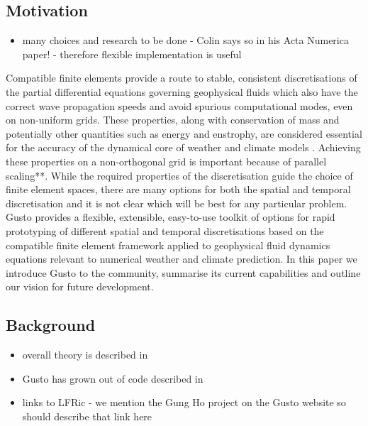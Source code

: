 \documentclass[journal abbreviation, manuscript]{copernicus}
\begin{document}
\introduction   %

\subsection{Motivation}
\begin{itemize}
\item many choices and research to be done - Colin says so in his Acta Numerica paper! - therefore flexible implementation is useful
\end{itemize}

Compatible finite elements provide a route to stable, consistent
discretisations of the partial differential equations governing
geophysical fluids which also have the correct wave propagation speeds
and avoid spurious computational modes, even on non-uniform
grids. These properties, along with conservation of mass and
potentially other quantities such as energy and enstrophy, are
considered essential for the accuracy of the dynamical core of weather
and climate models \citep{staniforth2012horizontal}. Achieving these
properties on a non-orthogonal grid is important because of parallel
scaling**. While the required properties of the discretisation guide the
choice of finite element spaces, there are many options for both the
spatial and temporal discretisation and it is not clear which will be
best for any particular problem. Gusto provides a flexible,
extensible, easy-to-use toolkit of options for rapid prototyping of
different spatial and temporal discretisations based on the compatible
finite element framework applied to geophysical fluid dynamics
equations relevant to numerical weather and climate prediction. In
this paper we introduce Gusto to the community, summarise its current
capabilities and outline our vision for future development.

\subsection{Background}

\begin{itemize}
\item overall theory is described in \citet{gibson2019compatible, cotter2023compatible}
\item Gusto has grown out of code described in \citet{natale2016compatible, cotter2012mixed, bendall2019recovered, bendall2020compatible, yamazaki2017vertical, shipton2018higher}
\item links to LFRic - we mention the Gung Ho project on the Gusto website so should describe that link here
\end{itemize}
\end{document}
